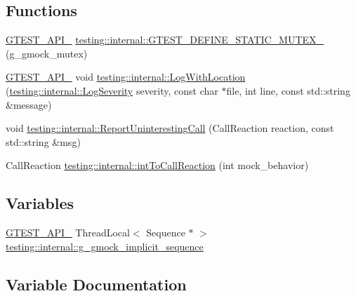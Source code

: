 \subsection*{Functions}
\begin{DoxyCompactItemize}
\item 
\mbox{\hyperlink{_obj__test_2lib_2googletest-release-1_88_81_2googletest_2include_2gtest_2internal_2gtest-port_8h_aa73be6f0ba4a7456180a94904ce17790}{G\+T\+E\+S\+T\+\_\+\+A\+P\+I\+\_\+}} \mbox{\hyperlink{namespacetesting_1_1internal_a8c4aa7be8daa7b60e293071d70a89584}{testing\+::internal\+::\+G\+T\+E\+S\+T\+\_\+\+D\+E\+F\+I\+N\+E\+\_\+\+S\+T\+A\+T\+I\+C\+\_\+\+M\+U\+T\+E\+X\+\_\+}} (g\+\_\+gmock\+\_\+mutex)
\item 
\mbox{\hyperlink{_obj__test_2lib_2googletest-release-1_88_81_2googletest_2include_2gtest_2internal_2gtest-port_8h_aa73be6f0ba4a7456180a94904ce17790}{G\+T\+E\+S\+T\+\_\+\+A\+P\+I\+\_\+}} void \mbox{\hyperlink{namespacetesting_1_1internal_a07f4411f23f8b1b731858be9dda3fdcc}{testing\+::internal\+::\+Log\+With\+Location}} (\mbox{\hyperlink{namespacetesting_1_1internal_a203d1a8a2147a53d12bbdae40d443914}{testing\+::internal\+::\+Log\+Severity}} severity, const char $\ast$file, int line, const std\+::string \&message)
\item 
void \mbox{\hyperlink{namespacetesting_1_1internal_af045b703d8487374620a8106a76814ee}{testing\+::internal\+::\+Report\+Uninteresting\+Call}} (Call\+Reaction reaction, const std\+::string \&msg)
\item 
Call\+Reaction \mbox{\hyperlink{namespacetesting_1_1internal_a55ce2ee38c64db1a89feae3751439620}{testing\+::internal\+::int\+To\+Call\+Reaction}} (int mock\+\_\+behavior)
\end{DoxyCompactItemize}
\subsection*{Variables}
\begin{DoxyCompactItemize}
\item 
\mbox{\hyperlink{_obj__test_2lib_2googletest-release-1_88_81_2googletest_2include_2gtest_2internal_2gtest-port_8h_aa73be6f0ba4a7456180a94904ce17790}{G\+T\+E\+S\+T\+\_\+\+A\+P\+I\+\_\+}} Thread\+Local$<$ Sequence $\ast$ $>$ \mbox{\hyperlink{namespacetesting_1_1internal_af4407fe8aeb1e43b2f58940736a20590}{testing\+::internal\+::g\+\_\+gmock\+\_\+implicit\+\_\+sequence}}
\end{DoxyCompactItemize}


\subsection{Variable Documentation}
\mbox{\label{googletest-master_2googlemock_2src_2gmock-spec-builders_8cc_a8eedfa563d9488da77e2972262a6adda}} 
